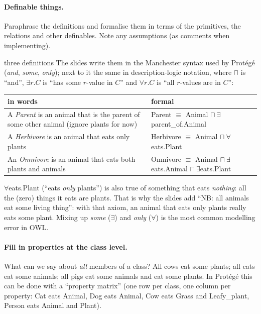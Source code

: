 \paragraph{Definable things.}
Paraphrase the definitions and formalise them in terms of the primitives, the relations
and other definables. Note any assumptions (as comments when implementing).

\begin{nbexample}{three definitions}
The slides write them in the Manchester syntax used by Protégé (\emph{and}, \emph{some},
\emph{only}); next to it the same in description-logic notation, where $\sqcap$ is
``and'', $\exists r.C$ is ``has some $r$-value in $C$'' and $\forall r.C$ is ``all
$r$-values are in $C$'':
\begin{center}
\small
\begin{tabularx}{\linewidth}{@{}>{\raggedright\arraybackslash}X l@{}}
\toprule
\textbf{in words} & \textbf{formal} \\
\midrule
A \emph{Parent} is an animal that is the parent of some other animal (ignore plants for
  now) & Parent $\equiv$ Animal $\sqcap\ \exists$parent\_of.Animal \\
A \emph{Herbivore} is an animal that eats only plants & Herbivore $\equiv$ Animal
  $\sqcap\ \forall$eats.Plant \\
An \emph{Omnivore} is an animal that eats both plants and animals & Omnivore $\equiv$
  Animal $\sqcap\ \exists$eats.Animal $\sqcap\ \exists$eats.Plant \\
\bottomrule
\end{tabularx}
\end{center}
\end{nbexample}

\begin{nbwarning}
$\forall$eats.Plant (``eats \emph{only} plants'') is also true of something that eats
\emph{nothing}: all the (zero) things it eats are plants. That is why the slides add
``NB: all animals eat some living thing'': with that axiom, an animal that eats only
plants really eats some plant. Mixing up \emph{some} ($\exists$) and \emph{only}
($\forall$) is the most common modelling error in OWL.
\end{nbwarning}

\paragraph{Fill in properties at the class level.}
What can we say about \emph{all} members of a class? All cows eat some plants; all cats
eat some animals; all pigs eat some animals and eat some plants. In Protégé this can be
done with a ``property matrix'' (one row per class, one column per property: Cat eats
Animal, Dog eats Animal, Cow eats Grass and Leafy\_plant, Person eats Animal and Plant).

